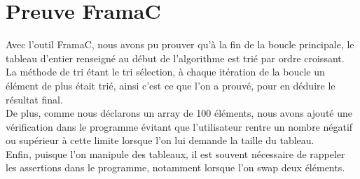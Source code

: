 \documentclass{scrreprt}
\begin{document}
\section{Preuve FramaC}
Avec l'outil FramaC, nous avons pu prouver qu'à la fin de la boucle principale, le tableau d'entier renseigné au début de l'algorithme est trié par ordre croissant.\\
La méthode de tri étant le tri sélection, à chaque itération de la boucle un élément de plus était trié, ainsi c'est ce que l'on a prouvé, pour en déduire le résultat final.\\
De plus, comme nous déclarons un array de 100 éléments, nous avons ajouté une vérification dans le programme évitant que l'utilisateur rentre un nombre négatif ou supérieur à cette limite lorsque l'on lui demande la taille du tableau.\\
Enfin, puisque l'on manipule des tableaux, il est souvent nécessaire de rappeler les assertions dans le programme, notamment lorsque l'on swap deux éléments.\\
\end{document}
